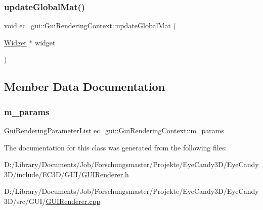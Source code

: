 \mbox{\label{classec__gui_1_1_gui_rendering_context_addd7274c823f916cf068c9875c43624b}} 
\subsubsection{\texorpdfstring{update\+Global\+Mat()}{updateGlobalMat()}}
{\footnotesize\ttfamily void ec\+\_\+gui\+::\+Gui\+Rendering\+Context\+::update\+Global\+Mat (\begin{DoxyParamCaption}\item[{\mbox{\hyperlink{classec__gui_1_1_widget}{Widget}} $\ast$}]{widget }\end{DoxyParamCaption})}



\subsection{Member Data Documentation}
\mbox{\label{classec__gui_1_1_gui_rendering_context_a841f3675bdfab3c2566bc889d25e6e8b}} 
\subsubsection{\texorpdfstring{m\+\_\+params}{m\_params}}
{\footnotesize\ttfamily \mbox{\hyperlink{structec__gui_1_1_gui_rendering_parameter_list}{Gui\+Rendering\+Parameter\+List}} ec\+\_\+gui\+::\+Gui\+Rendering\+Context\+::m\+\_\+params}



The documentation for this class was generated from the following files\+:\begin{DoxyCompactItemize}
\item 
D\+:/\+Library/\+Documents/\+Job/\+Forschungsmaster/\+Projekte/\+Eye\+Candy3\+D/\+Eye\+Candy3\+D/include/\+E\+C3\+D/\+G\+U\+I/\mbox{\hyperlink{_g_u_i_renderer_8h}{G\+U\+I\+Renderer.\+h}}\item 
D\+:/\+Library/\+Documents/\+Job/\+Forschungsmaster/\+Projekte/\+Eye\+Candy3\+D/\+Eye\+Candy3\+D/src/\+G\+U\+I/\mbox{\hyperlink{_g_u_i_renderer_8cpp}{G\+U\+I\+Renderer.\+cpp}}\end{DoxyCompactItemize}
